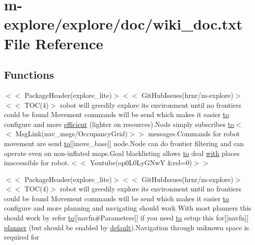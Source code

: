 \hypertarget{wiki__doc_8txt}{}\section{m-\/explore/explore/doc/wiki\+\_\+doc.txt File Reference}
\label{wiki__doc_8txt}
\subsection*{Functions}
\begin{DoxyCompactItemize}
\item 
$<$$<$ Package\+Header(explore\+\_\+lite)$>$$<$$<$ Git\+Hub\+Issues(hrnr/m-\/explore)$>$$<$$<$ T\+OC(4)$>$ robot will greedily explore its environment until no frontiers could be found Movement commands will be send which makes it easier \hyperlink{wiki__doc_8txt_a59f010b39e38734a32109cf8c8310f81}{to} configure and more \hyperlink{wiki__doc_8txt_af39469afb7931f3c1518b0fc5776008f}{efficient} (lighter on resources).Node simply subscribes \hyperlink{wiki__doc_8txt_a59f010b39e38734a32109cf8c8310f81}{to}$<$$<$ Msg\+Link(nav\+\_\+msgs/Occupancy\+Grid)$>$$>$ messages.\+Commands for robot movement are send \hyperlink{wiki__doc_8txt_a59f010b39e38734a32109cf8c8310f81}{to}\mbox{[}\mbox{[}move\+\_\+base\mbox{]}\mbox{]} node.\+Node can do frontier filtering and can operate even on non-\/inflated maps.\+Goal blacklisting allows \hyperlink{wiki__doc_8txt_a59f010b39e38734a32109cf8c8310f81}{to} deal \hyperlink{wiki__doc_8txt_a110243189100ad190f1295ade52a39a6}{with} places inaccessible for robot.$<$$<$ Youtube(op0\+L0\+Ly\+G\+NwY \&rel=0)$>$$>$
\item 
$<$$<$ Package\+Header(explore\+\_\+lite)$>$$<$$<$ Git\+Hub\+Issues(hrnr/m-\/explore)$>$$<$$<$ T\+OC(4)$>$ robot will greedily explore its environment until no frontiers could be found Movement commands will be send which makes it easier \hyperlink{wiki__doc_8txt_a59f010b39e38734a32109cf8c8310f81}{to} configure and more planning and navigating should work With most planners this should work by refer \hyperlink{wiki__doc_8txt_a59f010b39e38734a32109cf8c8310f81}{to}\mbox{[}\mbox{[}navfn\#Parameters\mbox{]}\mbox{]} if you need \hyperlink{wiki__doc_8txt_a59f010b39e38734a32109cf8c8310f81}{to} setup this for\mbox{[}\mbox{[}navfn\mbox{]}\mbox{]} \hyperlink{wiki__doc_8txt_a1e6f68edc2fdd58ace512f96917cd16e}{planner} (but should be enabled by \hyperlink{wiki__doc_8txt_a2da1dda6a041d7dbeb3aef440c695a60}{default}).Navigation through unknown space is required for
\end{DoxyCompactItemize}

